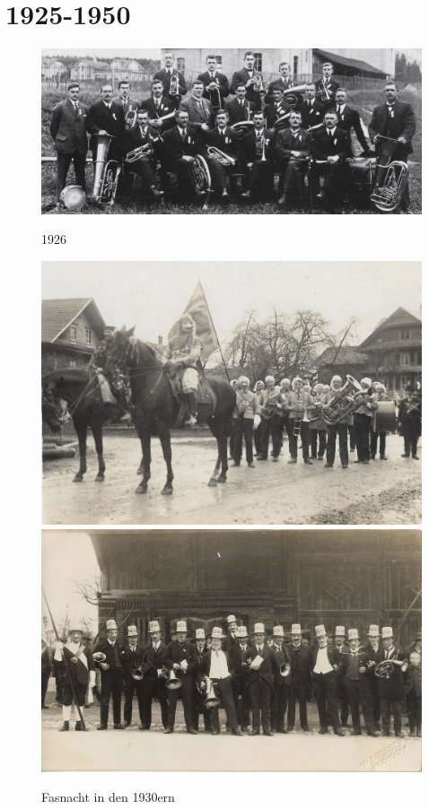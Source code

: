 \documentclass[openany]{book}
\begin{document}
\section{1925-1950}
\begin{figure}[p]
    \centering
    \includegraphics{./chap/1925-1950/MGH-1926.jpg}
    \label{fig:mgh-1926}
    \caption{1926}
\end{figure}

\begin{figure}[h]
    \centerline{
        \includegraphics{./chap/1925-1950/Fasnacht-1930er.jpg}
        \includegraphics{./chap/1925-1950/Fasnacht-vor-Kreuz-Scheune-1930er.jpg}
    }
    \label{fig:mgh-fasnacht-1930}
    \caption{Fasnacht in den 1930ern}
\end{figure}
\end{document}
